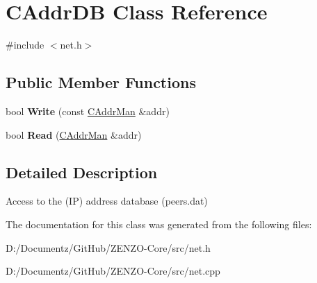 \hypertarget{class_c_addr_d_b}{}\section{C\+Addr\+DB Class Reference}
\label{class_c_addr_d_b}


{\ttfamily \#include $<$net.\+h$>$}

\subsection*{Public Member Functions}
\begin{DoxyCompactItemize}
\item 
\mbox{\label{class_c_addr_d_b_aaec90dba59cd69a2f25bc5630a1dde39}} 
bool {\bfseries Write} (const \mbox{\hyperlink{class_c_addr_man}{C\+Addr\+Man}} \&addr)
\item 
\mbox{\label{class_c_addr_d_b_aed4b567fb7c2dd15b2856e7c769967b7}} 
bool {\bfseries Read} (\mbox{\hyperlink{class_c_addr_man}{C\+Addr\+Man}} \&addr)
\end{DoxyCompactItemize}


\subsection{Detailed Description}
Access to the (IP) address database (peers.\+dat) 

The documentation for this class was generated from the following files\+:\begin{DoxyCompactItemize}
\item 
D\+:/\+Documentz/\+Git\+Hub/\+Z\+E\+N\+Z\+O-\/\+Core/src/net.\+h\item 
D\+:/\+Documentz/\+Git\+Hub/\+Z\+E\+N\+Z\+O-\/\+Core/src/net.\+cpp\end{DoxyCompactItemize}
